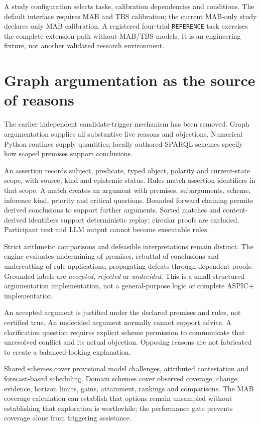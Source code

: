 \documentclass[11pt,a4paper]{article}
\begin{document}
A study configuration selects tasks, calibration dependencies and conditions. The default interface requires MAB and TBS calibration; the current MAB-only study declares only MAB calibration. A registered four-trial \texttt{REFERENCE} task exercises the complete extension path without MAB/TBS models. It is an engineering fixture, not another validated research environment.

\section{Graph argumentation as the source of reasons}
The earlier independent candidate-trigger mechanism has been removed. Graph argumentation supplies all substantive live reasons and objections. Numerical Python routines supply quantities; locally authored SPARQL schemes specify how scoped premises support conclusions.

An assertion records subject, predicate, typed object, polarity and current-state scope, with source, kind and epistemic status. Rules match assertion identifiers in that scope. A match creates an argument with premises, subarguments, scheme, inference kind, priority and critical questions. Bounded forward chaining permits derived conclusions to support further arguments. Sorted matches and content-derived identifiers support deterministic replay; circular proofs are excluded. Participant text and LLM output cannot become executable rules.

Strict arithmetic comparisons and defeasible interpretations remain distinct. The engine evaluates undermining of premises, rebuttal of conclusions and undercutting of rule applications, propagating defeats through dependent proofs. Grounded labels are \emph{accepted}, \emph{rejected} or \emph{undecided}. This is a small structured argumentation implementation, not a general-purpose logic or complete ASPIC+ implementation.

An accepted argument is justified under the declared premises and rules, not certified true. An undecided argument normally cannot support advice. A clarification question requires explicit scheme permission to communicate that unresolved conflict and its actual objection. Opposing reasons are not fabricated to create a balanced-looking explanation.

Shared schemes cover provisional model challenges, attributed contestation and forecast-based scheduling. Domain schemes cover observed coverage, change evidence, horizon limits, gains, attainment, rankings and comparisons. The MAB coverage calculation can establish that options remain unsampled without establishing that exploration is worthwhile; the performance gate prevents coverage alone from triggering assistance.
\end{document}
